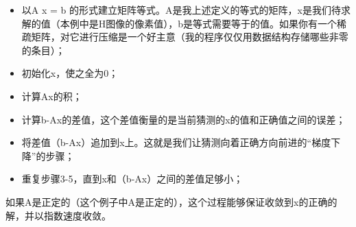 \begin{itemize}
\item 以A x = b 的形式建立矩阵等式。A是我上述定义的等式的矩阵，x是我们待求解的值（本例中是H图像的像素值），b是等式需要等于的值。如果你有一个稀疏矩阵，对它进行压缩是一个好主意（我的程序仅仅用数据结构存储哪些非零的条目）；
\item 初始化x，使之全为0；
\item 计算Ax的积；
\item 计算b-Ax的差值，这个差值衡量的是当前猜测的x的值和正确值之间的误差；
\item 将差值（b-Ax）追加到x上。这就是我们让猜测向着正确方向前进的“梯度下降”的步骤；
\item 重复步骤3-5，直到x和（b-Ax）之间的差值足够小；
\end{itemize}

如果A是正定的（这个例子中A是正定的），这个过程能够保证收敛到x的正确的解，并以指数速度收敛。

\ifx\usechapbib\empty
\nocite{BSTcontrol}


\fi